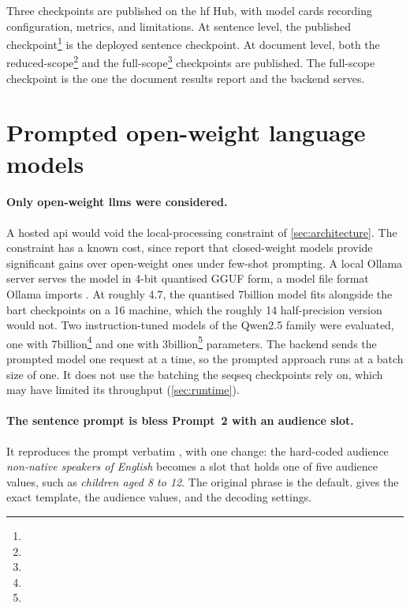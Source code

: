 Three checkpoints are published on the \gls{hf} Hub, with model cards recording configuration, metrics, and limitations.
At sentence level, the published checkpoint\footnote{} is the deployed sentence checkpoint.
At document level, both the reduced-scope\footnote{} and the full-scope\footnote{} checkpoints are published.
The full-scope checkpoint is the one the document results report and the backend serves.

\section{Prompted open-weight language models}
\label{sec:method-three}

\paragraph{Only open-weight \glspl{llm} were considered.}
A hosted \gls{api} would void the local-processing constraint of \cref{sec:architecture}.
The constraint has a known cost, since \textcite[13291]{kew-etal-2023-bless} report that closed-weight models provide significant gains over open-weight ones under few-shot prompting.
A local Ollama server \parencite{ollama-docs-api} serves the model in 4-bit quantised GGUF form, a model file format Ollama imports \parencite{ollama-docs-import}.
At roughly \qty{4.7}{}, the quantised 7\gls{billion} model fits alongside the \gls{bart} checkpoints on a \qty{16}{} machine, which the roughly \qty{14}{} half-precision version would not.
Two instruction-tuned models of the Qwen2.5 family \parencite[1]{qwen2024qwen25} were evaluated, one with 7\gls{billion}\footnote{} and one with 3\gls{billion}\footnote{} parameters.
The backend sends the prompted model one request at a time, so the prompted approach runs at a batch size of one.
It does not use the batching the \gls{seqseq} checkpoints rely on, which may have limited its throughput (\cref{sec:runtime}).

\paragraph{The sentence prompt is \gls{bless} Prompt~2 with an audience slot.}
It reproduces the prompt verbatim \parencite[13294]{kew-etal-2023-bless}, with one change: the hard-coded audience \emph{non-native speakers of English} becomes a slot that holds one of five audience values, such as \emph{children aged 8 to 12}.
The original phrase is the default.
 gives the exact template, the audience values, and the decoding settings.


